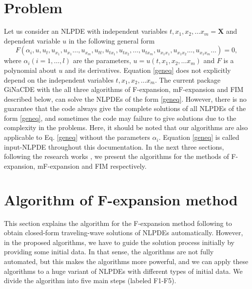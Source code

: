 \documentclass[prd,aps,floats,showkeys,nofootinbib,notitlepage]{revtex4}
\begin{document}
	\section{Problem}
	\par Let us consider an NLPDE with independent variables $t,x_1,x_2, \ldots x_m=\mathbf{X}$ and dependent variable $u$ in the following general form
	\begin{equation}\label{geneq}
		F\left( {\alpha_i,u,u_t,u_{x_1},u_{x_1} \ldots ,u_{x_m},u_{tt},u_{t{x_1}},u_{t{x_2}}, \ldots ,u_{t{x_m}},u_{{x_1}{x_1}},u_{{x_1}{x_2}} \ldots ,u_{{x_1}{x_m}} \ldots } \right) = 0,
	\end{equation}
	where $\alpha_i(i=1,\ldots,l)$ are the parameters, $u=u(t,x_1,x_2, \ldots x_m)$ and $F$ is a polynomial about $u$ and its derivatives. Equation \eqref{geneq} does not explicitly depend on the independent variables $t,x_1,x_2, \ldots x_m$. The current package GiNaCDE with the all three algorithms of F-expansion, mF-expansion and FIM described below, can solve the NLPDEs of the form \eqref{geneq}. However, there is no guarantee that the code always give the complete solutions of all NLPDEs of the form \eqref{geneq}, and sometimes the code may failure to give solutions due to the complexity in the problems. Here, it should be noted that our algorithms are also applicable to Eq. \eqref{geneq} without the parameters $\alpha_i$. Equation \eqref{geneq} is called input-NLPDE throughout this documentation. In the next three sections, following the research works \cite{fexpn024,fexpn024_1,fexpn123,0246,234,modfexpn,fim0,fim,mirza,complexTwt1}, we present the algorithms for the methods of F-expansion, mF-expansion and FIM respectively.  
	
	\section{Algorithm of F-expansion method}\label{sec:Fexpn}
	This section explains the algorithm for the F-expansion method following \cite{fexpn024,fexpn024_1,fexpn123,0246,234} to obtain closed-form traveling-wave solutions of NLPDEs automatically. However, in the proposed algorithms, we have to guide the solution process initially by providing some initial data. In that sense, the algorithms are not fully automated, but this makes the algorithms more powerful, and we can apply these algorithms to a huge variant of NLPDEs with different types of initial data.
	We divide the algorithm into five main steps (labeled F1-F5).  
	
\end{document}
